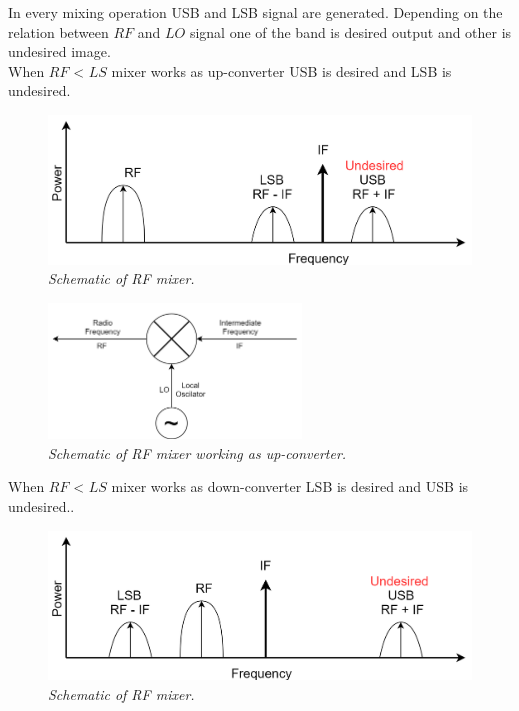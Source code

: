 \documentclass[en,printmode]{mgr}
\begin{document}
		In every mixing operation USB and LSB signal are generated. Depending on the relation between $RF$ and $LO$
		signal one of the band is desired output and other is undesired image.
		\\
		
		When $RF$ < $LS$ mixer works as up-converter USB is desired and LSB is undesired.
		\begin{figure}[!htb]
    		\centering
   			\includegraphics[width=\textwidth]{diag/upconv.png}
    		\caption{\textit{Schematic of RF mixer.}}
		\end{figure}
		
		\begin{figure}[!htb]
    		\centering
   			\includegraphics[width=0.6\textwidth]{diag/upmx.png}
    		\caption{\textit{Schematic of RF mixer working as up-converter.}}
		\end{figure}
		
		When $RF$ < $LS$ mixer works as down-converter LSB is desired and USB is undesired..
		\begin{figure}[!htb]
    		\centering
   			\includegraphics[width=\textwidth]{diag/downconv.png}
    		\caption{\textit{Schematic of RF mixer.}}
		\end{figure}
		
\end{document}
